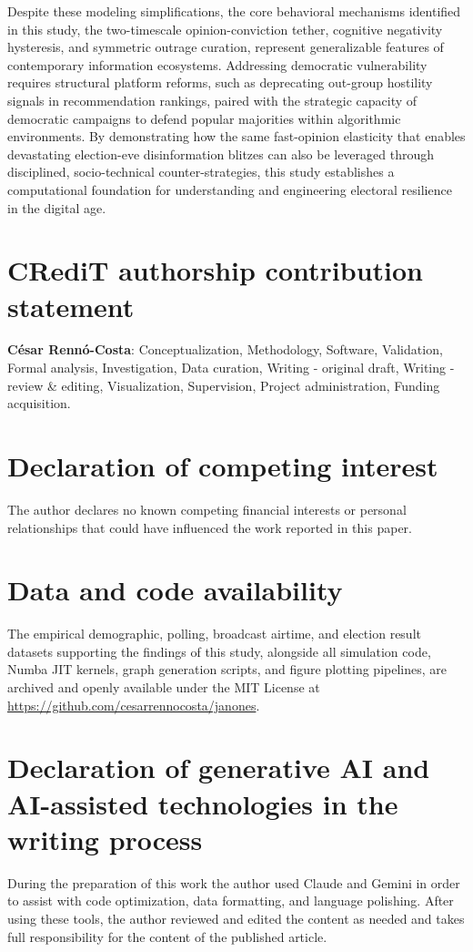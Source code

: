 \documentclass[a4paper,fleqn]{cas-dc}
\begin{document}
Despite these modeling simplifications, the core behavioral mechanisms identified in this study, the two-timescale opinion-conviction tether, cognitive negativity hysteresis, and symmetric outrage curation, represent generalizable features of contemporary information ecosystems. Addressing democratic vulnerability requires structural platform reforms, such as deprecating out-group hostility signals in recommendation rankings, paired with the strategic capacity of democratic campaigns to defend popular majorities within algorithmic environments. By demonstrating how the same fast-opinion elasticity that enables devastating election-eve disinformation blitzes can also be leveraged through disciplined, socio-technical counter-strategies, this study establishes a computational foundation for understanding and engineering electoral resilience in the digital age.

\section*{CRediT authorship contribution statement}
\textbf{César Rennó-Costa}: Conceptualization, Methodology, Software, Validation, Formal analysis, Investigation, Data curation, Writing - original draft, Writing - review \& editing, Visualization, Supervision, Project administration, Funding acquisition.

\section*{Declaration of competing interest}
The author declares no known competing financial interests or personal relationships that could have influenced the work reported in this paper.

\section*{Data and code availability}
The empirical demographic, polling, broadcast airtime, and election result datasets supporting the findings of this study, alongside all simulation code, Numba JIT kernels, graph generation scripts, and figure plotting pipelines, are archived and openly available under the MIT License at \url{https://github.com/cesarrennocosta/janones}.

\section*{Declaration of generative AI and AI-assisted technologies in the writing process}
During the preparation of this work the author used Claude and Gemini in order to assist with code optimization, data formatting, and language polishing. After using these tools, the author reviewed and edited the content as needed and takes full responsibility for the content of the published article.
\end{document}
